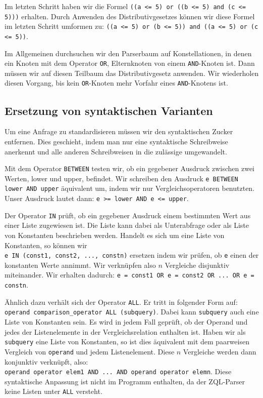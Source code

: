 Im letzten Schritt haben wir die Formel \verb|((a <= 5) or ((b <= 5) and (c <= 5)))| erhalten. Durch Anwenden des Distributivgesetzes können wir diese Formel im letzten Schritt umformen zu: \verb|((a <= 5) or (b <= 5)) and ((a <= 5) or (c <= 5))|.

Im Allgemeinen durchsuchen wir den Parserbaum auf Konstellationen, in denen ein Knoten mit dem Operator \verb|OR|, Elternknoten von einem \verb|AND|-Knoten ist. Dann müssen wir auf diesen Teilbaum das Distributivgesetz anwenden. Wir wiederholen diesen Vorgang, bis kein \verb|OR|-Knoten mehr Vorfahr eines \verb|AND|-Knotens ist.

\subsection{Ersetzung von syntaktischen Varianten}

Um eine Anfrage zu standardisieren müssen wir den syntaktischen Zucker entfernen. Dies geschieht, indem man nur eine syntaktische Schreibweise anerkennt und alle anderen Schreibweisen in die zulässige umgewandelt. 

Mit dem Operator \verb|BETWEEN| testen wir, ob ein gegebener Ausdruck zwischen zwei Werten, lower und upper, befindet. Wir schreiben den Ausdruck \verb|e BETWEEN lower AND upper| äquivalent um, indem wir nur Vergleichsoperatoren benutzten. \\Unser Ausdruck lautet dann: \verb|e >= lower AND e <= upper|.

Der Operator \verb|IN| prüft, ob ein gegebener Ausdruck einem bestimmten Wert aus einer Liste zugewiesen ist. Die Liste kann dabei als Unterabfrage oder als Liste von Konstanten beschrieben werden. Handelt es sich um eine Liste von Konstanten, so können wir \\\verb|e IN (const1, const2, ..., constn)| ersetzen indem wir prüfen, ob \verb|e| einen der konstanten Werte annimmt. Wir verknüpfen also $n$ Vergleiche disjunktiv miteinander. Wir erhalten dadurch: \verb|e = const1 OR e = const2 OR ... OR e = constn|.

Ähnlich dazu verhält sich der Operator \verb|ALL|. Er tritt in folgender Form auf:\\
\verb|operand comparison_operator ALL (subquery)|. Dabei kann \verb|subquery| auch eine Liste von Konstanten sein. Es wird in jedem Fall geprüft, ob der Operand und jedes der Listenelemente in der Vergleichsrelation enthalten ist. Haben wir als \verb|subquery| eine Liste von Konstanten, so ist dies äquivalent mit dem paarweisen Vergleich von \verb|operand| und jedem Listenelement. Diese $n$ Vergleiche werden dann konjunktiv verknüpft, also: \\
\verb|operand operator elem1 AND ... AND operand operator elemn|. 
Diese syntaktische Anpassung ist nicht im Programm enthalten, da der ZQL-Parser keine Listen unter \verb|ALL| versteht.

